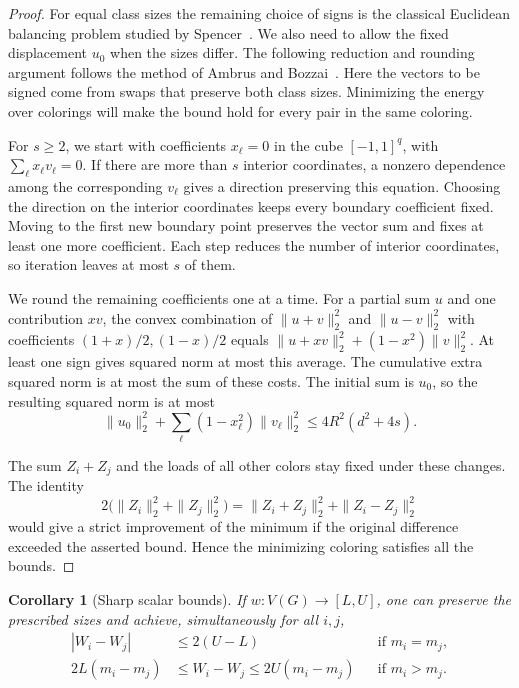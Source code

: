 \documentclass[11pt]{article}
\newtheorem{corollary}[theorem]{Corollary}
\begin{document}
\begin{proof}
For equal class sizes the remaining choice of signs is the classical Euclidean balancing problem studied by Spencer~\cite{Spencer}. We also need to allow the fixed displacement \(u_0\) when the sizes differ. The following reduction and rounding argument follows the method of Ambrus and Bozzai~\cite[Section~2 and Proposition~3.1]{AB}. Here the vectors to be signed come from swaps that preserve both class sizes. Minimizing the energy over colorings will make the bound hold for every pair in the same coloring.

For \(s\ge2\), we start with coefficients \(x_\ell=0\) in the cube \([-1,1]^q\), with \(\sum_\ell x_\ell v_\ell=0\). If there are more than \(s\) interior coordinates, a nonzero dependence among the corresponding \(v_\ell\) gives a direction preserving this equation. Choosing the direction on the interior coordinates keeps every boundary coefficient fixed. Moving to the first new boundary point preserves the vector sum and fixes at least one more coefficient. Each step reduces the number of interior coordinates, so iteration leaves at most \(s\) of them.

We round the remaining coefficients one at a time. For a partial sum \(u\) and one contribution \(xv\), the convex combination of \(\|u+v\|_2^2\) and \(\|u-v\|_2^2\) with coefficients \((1+x)/2,(1-x)/2\) equals \(\|u+xv\|_2^2+(1-x^2)\|v\|_2^2\). At least one sign gives squared norm at most this average. The cumulative extra squared norm is at most the sum of these costs. The initial sum is \(u_0\), so the resulting squared norm is at most
\[
  \|u_0\|_2^2+\sum_\ell(1-x_\ell^2)\|v_\ell\|_2^2
  \le 4R^2(d^2+4s).
\]

The sum \(Z_i+Z_j\) and the loads of all other colors stay fixed under these changes. The identity
\[
  2\bigl(\|Z_i\|_2^2+\|Z_j\|_2^2\bigr)
    =\|Z_i+Z_j\|_2^2+\|Z_i-Z_j\|_2^2
\]
would give a strict improvement of the minimum if the original difference exceeded the asserted bound. Hence the minimizing coloring satisfies all the bounds.
\end{proof}

\begin{corollary}[Sharp scalar bounds]\label{cor:scalar}
If \(w:V(G)\to[L,U]\), one can preserve the prescribed sizes and achieve, simultaneously for all \(i,j\),
\[
\begin{aligned}
 |W_i-W_j|&\le2(U-L) &&\text{if }m_i=m_j,\\
 2L(m_i-m_j)&\le W_i-W_j\le2U(m_i-m_j)
       &&\text{if }m_i>m_j.
\end{aligned}
\]
\end{corollary}
\end{document}
